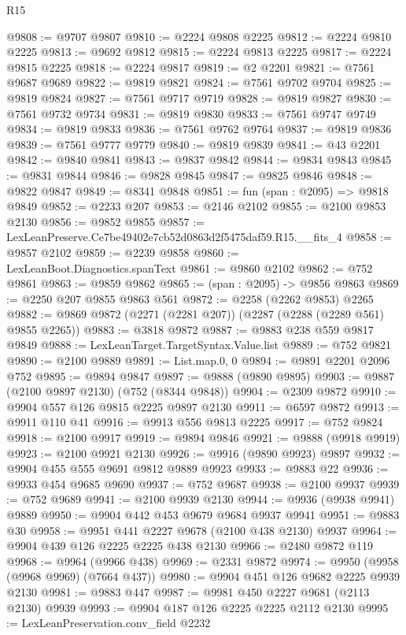 \begin{lexlean}{R15}
\begin{coremodule}
@9808 := @9707 @9807
@9810 := @2224 @9808 @2225
@9812 := @2224 @9810 @2225
@9813 := @9692 @9812
@9815 := @2224 @9813 @2225
@9817 := @2224 @9815 @2225
@9818 := @2224 @9817
@9819 := @2 @2201
@9821 := @7561 @9687 @9689
@9822 := @9819 @9821
@9824 := @7561 @9702 @9704
@9825 := @9819 @9824
@9827 := @7561 @9717 @9719
@9828 := @9819 @9827
@9830 := @7561 @9732 @9734
@9831 := @9819 @9830
@9833 := @7561 @9747 @9749
@9834 := @9819 @9833
@9836 := @7561 @9762 @9764
@9837 := @9819 @9836
@9839 := @7561 @9777 @9779
@9840 := @9819 @9839
@9841 := @43 @2201
@9842 := @9840 @9841
@9843 := @9837 @9842
@9844 := @9834 @9843
@9845 := @9831 @9844
@9846 := @9828 @9845
@9847 := @9825 @9846
@9848 := @9822 @9847
@9849 := @8341 @9848
@9851 := fun (span : @2095) => @9818 @9849
@9852 := @2233 @207
@9853 := @2146 @2102
@9855 := @2100 @9853 @2130
@9856 := @9852 @9855
@9857 := LexLeanPreserve.Ce7be49402e7cb52d0863d2f5475daf59.R15.__fits_4
@9858 := @9857 @2102
@9859 := @2239 @9858
@9860 := LexLeanBoot.Diagnostics.spanText
@9861 := @9860 @2102
@9862 := @752 @9861
@9863 := @9859 @9862
@9865 := (span : @2095) -> @9856 @9863
@9869 := @2250 @207 @9855 @9863 @561
@9872 := @2258 (@2262 @9853) @2265
@9882 := @9869 @9872 (@2271 (@2281 @207)) (@2287 (@2288 (@2289 @561) @9855 @2265))
@9883 := @3818 @9872
@9887 := @9883 @238 @559 @9817 @9849
@9888 := LexLeanTarget.TargetSyntax.Value.list
@9889 := @752 @9821
@9890 := @2100 @9889
@9891 := List.map.{0, 0}
@9894 := @9891 @2201 @2096 @752
@9895 := @9894 @9847
@9897 := @9888 (@9890 @9895)
@9903 := @9887 (@2100 @9897 @2130) (@752 (@8344 @9848))
@9904 := @2309 @9872
@9910 := @9904 @557 @126 @9815 @2225 @9897 @2130
@9911 := @6597 @9872
@9913 := @9911 @110 @41
@9916 := @9913 @556 @9813 @2225
@9917 := @752 @9824
@9918 := @2100 @9917
@9919 := @9894 @9846
@9921 := @9888 (@9918 @9919)
@9923 := @2100 @9921 @2130
@9926 := @9916 (@9890 @9923) @9897
@9932 := @9904 @455 @555 @9691 @9812 @9889 @9923
@9933 := @9883 @22
@9936 := @9933 @454 @9685 @9690
@9937 := @752 @9687
@9938 := @2100 @9937
@9939 := @752 @9689
@9941 := @2100 @9939 @2130
@9944 := @9936 (@9938 @9941) @9889
@9950 := @9904 @442 @453 @9679 @9684 @9937 @9941
@9951 := @9883 @30
@9958 := @9951 @441 @2227 @9678 (@2100 @438 @2130) @9937
@9964 := @9904 @439 @126 @2225 @2225 @438 @2130
@9966 := @2480 @9872 @119
@9968 := @9964 (@9966 @438)
@9969 := @2331 @9872
@9974 := @9950 (@9958 (@9968 @9969) (@7664 @437))
@9980 := @9904 @451 @126 @9682 @2225 @9939 @2130
@9981 := @9883 @447
@9987 := @9981 @450 @2227 @9681 (@2113 @2130) @9939
@9993 := @9904 @187 @126 @2225 @2225 @2112 @2130
@9995 := LexLeanPreservation.conv_field @2232

\end{coremodule}
\end{lexlean}
